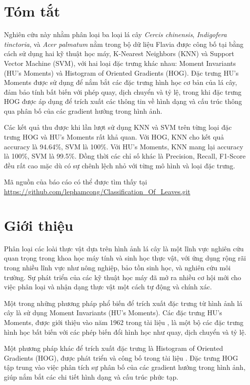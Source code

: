 \documentclass[a4paper]{article}
\begin{document}
\section*{Tóm tắt}
Nghiên cứu này nhằm phân loại ba loại lá cây \textit{Cercis chinensis}, \textit{Indigofera tinctoria}, và \textit{Acer palmatum} nằm trong bộ dữ liệu Flavia được công bố tại \cite{wu2007leaf} bằng cách sử dụng hai kỹ thuật học máy, K-Nearest Neighbors (KNN) và Support Vector Machine (SVM), với hai loại đặc trưng khác nhau: Moment Invariants (HU's Moments) và Histogram of Oriented Gradients (HOG). Đặc trưng HU's Moments được sử dụng để nắm bắt các đặc trưng hình học cơ bản của lá cây, đảm bảo tính bất biến với phép quay, dịch chuyển và tỷ lệ, trong khi đặc trưng HOG được áp dụng để trích xuất các thông tin về hình dạng và cấu trúc thông qua phân bố của các gradient hướng trong hình ảnh. 

Các kết quả thu được khi lần lượt sử dụng KNN và SVM trên từng loại đặc trưng HOG và HU's Moments rất khả quan. Với HOG, KNN cho kết quả accuracy là 94.64\%, SVM là 100\%. Với HU's Moments, KNN mang lại accuracy  là 100\%, SVM là 99.5\%. Đồng thời các chỉ số khác là Precision, Recall, F1-Score đều rất cao mặc dù có sự chênh lệch nhỏ với từng mô hình và loại đặc trưng.

Mã nguồn của báo cáo có thể được tìm thấy tại \url{https://github.com/lephamcong/Classification_Of_Leaves.git}


\section{Giới thiệu}
Phân loại các loài thực vật dựa trên hình ảnh lá cây là một lĩnh vực nghiên cứu quan trọng trong khoa học máy tính và sinh học thực vật, với ứng dụng rộng rãi trong nhiều lĩnh vực như nông nghiệp, bảo tồn sinh học, và nghiên cứu môi trường. Sự phát triển của các kỹ thuật học máy đã mở ra nhiều cơ hội mới cho việc phân loại và nhận dạng thực vật một cách tự động và chính xác.

Một trong những phương pháp phổ biến để trích xuất đặc trưng từ hình ảnh lá cây là sử dụng Moment Invariants (HU's Moments). Các đặc trưng HU's Moments, được giới thiệu vào năm 1962 trong tài liệu \cite{hu1962}, là một bộ các đặc trưng hình học bất biến với các phép biến đổi hình học như quay, dịch chuyển và tỷ lệ. 

Một phương pháp khác để trích xuất đặc trưng là Histogram of Oriented Gradients (HOG), được phát triển và công bố trong tài liệu \cite{hog2005}. Đặc trưng HOG tập trung vào việc phân tích sự phân bố của các gradient hướng trong hình ảnh, giúp nắm bắt các chi tiết hình dạng và cấu trúc phức tạp. 
\end{document}
